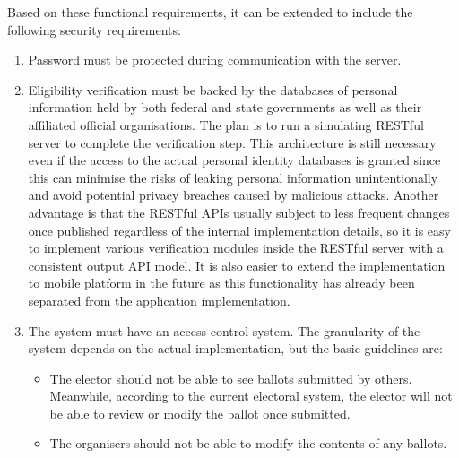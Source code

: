\documentclass[12pt]{article}
\begin{document}
Based on these functional requirements, it can be extended to include the following security requirements:
\begin{enumerate}
  \item Password must be protected during communication with the server.
  \item Eligibility verification  must be backed by the databases of personal information held by both federal and state governments as well as their affiliated official organisations. The plan is to run a simulating RESTful server to complete the verification step. This architecture is still necessary even if the access to the actual personal identity databases is granted since this can minimise the risks of leaking personal information unintentionally and avoid potential privacy breaches caused by malicious attacks. Another advantage is that the RESTful APIs usually subject to less frequent changes once published regardless of the internal implementation details, so it is easy to implement various verification modules inside the RESTful server with a consistent output API model. It is also easier to extend the implementation to mobile platform in the future as this functionality has already been separated from the application implementation.
  \item The system must have an access control system. The granularity of the system depends on the actual implementation, but the basic guidelines are:
  \begin{itemize}
    \item The elector should not be able to see ballots submitted by others. Meanwhile, according to the current electoral system, the elector will not be able to review or modify the ballot once submitted.
    \item The organisers should not be able to modify the contents of any ballots.
  \end{itemize}
\end{enumerate}
\end{document}
